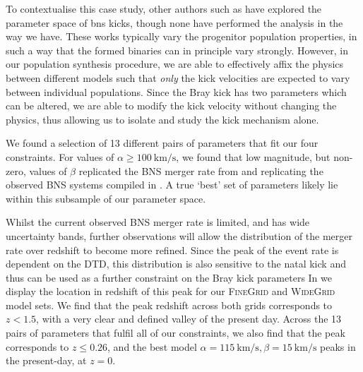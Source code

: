 To contextualise this case study, other authors such as \citet{Mapelli:2018, Wiktorowicz:2019, Giacobbo:2020, Santoliquido:2021, Kapil:2023} have explored the parameter space of \gls{bns} kicks, though none have performed the analysis in the way we have. These works typically vary the progenitor population properties, in such a way that the formed binaries can in principle vary strongly. However, in our population synthesis procedure, we are able to effectively affix the physics between different models such that \textit{only} the kick velocities are expected to vary between individual populations. Since the Bray kick has two parameters which can be altered, we are able to modify the kick velocity without changing the physics, thus allowing us to isolate and study the kick mechanism alone.

We found a selection of 13 different pairs of parameters that fit our four constraints. For values of $\alpha\geq \SI{100}{\kilo\meter\per\second}$, we found that low magnitude, but non-zero, values of $\beta$ replicated the BNS merger rate from \citet{LIGOVirgo:2021b} and replicating the observed BNS systems compiled in \citet{Vigna-gomez:2018}. A true `best' set of parameters likely lie within this subsample of our parameter space.


Whilst the current observed BNS merger rate is limited, and has wide uncertainty bands, further observations will allow the distribution of the merger rate over redshift to become more refined. Since the peak of the event rate is dependent on the DTD, this distribution is also sensitive to the natal kick and thus can be used as a further constraint on the Bray kick parameters In  we display the location in redshift of this peak for our \textsc{FineGrid} and \textsc{WideGrid} model sets. We find that the peak redshift across both grids corresponds to $z<1.5$, with a very clear and defined valley of the present day. Across the 13 pairs of parameters that fulfil all of our constraints, we also find that the peak corresponds to $z\leq0.26$, and the best model $\alpha=\SI{115}{\kilo\meter\per\second}, \beta=\SI{15}{\kilo\meter\per\second}$ peaks in the present-day, at $z=0$.

